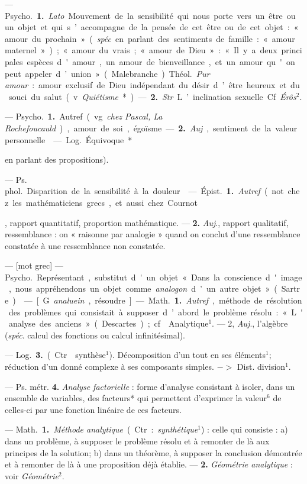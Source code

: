\begin{itemize}[leftmargin=1cm, label=, itemsep=1pt]
{{{ — \si{Psycho.} {\bf 1.} {\it Lato}.
Mouvement de la sensibilité qui nous porte
vers un être ou un objet et qui s’accompagne de la pensée de cet être
ou de cet objet : « amour du prochain » ({\it spéc}. en parlant des
sentiments de famille : « amour maternel »); « amour du vrais; « amour de
Dieu » : « Il y a deux principales
espèces d'amour, un amour de bienveillance, et un amour qu'on peut
appeler d’union » (Malebranche).
\si{Théol.} {\it Pur amour} : amour exclusif
de Dieu indépendant du désir d’être
heureux et du souci du salut (v.
{\it Quiétisme}*). — {\bf 2.} {\it Str}. L’inclination
sexuelle. Cf. {\it Érôs}$^2$.

 — \si{Psycho.} {\bf 1.} Autref.
(vg. {\it chez Pascal, La Rochefoucauld}),
amour de soi, égoïsme. — {\bf 2.} {\it Auj}.,
sentiment de la valeur personnelle.

 — \si{Log.} Équivoque*
{en parlant des propositions).

 — \si{Ps. phol.} Disparition
de la sensibilité à la douleur.

 — \si{Épist.} {\bf 1.} {\it Autref}. (not.
chez les mathématiciens grecs, et
aussi chez Cournot}, rapport quantitatif, proportion mathématique. —
 {\bf 2.} {\it Auj}., rapport qualitatif, ressemblance : on « raisonne par analogie »
quand on conclut d’une ressemblance constatée à une ressemblance
non constatée.

 — [mot grec] — \si{Psycho.} Représentant,
substitut d'un objet
« Dans la conscience d'image, nous
appréhendons un objet comme {\it analogon} d’un autre objet » (Sartre).

 — [G. {\it analuein}, résoudre] —
\si{Math.} {\bf 1.} {\it Autref}., méthode de résolution des problèmes qui consistait
à supposer d’abord le problème résolu : « L'analyse des anciens »
(Descartes) ; cf. {\it }Analytique$^1$. — 2,
{\it Auj}., l'algèbre ({\it spéc}. calcul des fonctions ou calcul infinitésimal).

— \si{Log.} {\bf 3.} (Ctr. {\it }synthèse$^1$).
Décomposition d’un tout en ses éléments$^1$; réduction d'un donné
complexe à ses composants simples. $->$ Dist. division$^1$.

— Ps. métr. {\bf 4.} {\it Analyse factorielle} : forme d'analyse consistant à
isoler, dans un ensemble de variables,
des facteurs* qui permettent d’exprimer la valeur$^6$ de celles-ci par une
fonction linéaire de ces facteurs.

 — \si{Math.} {\bf 1.} {\it Méthode analytique} (Ctr. : {\it synthétique}$^1$) : celle
qui consiste : a) dans un problème,
à supposer le problème résolu et à
remonter de là aux principes de la
solution; b) dans un théorème, à
supposer la conclusion démontrée et
à remonter de là à une proposition
déjà établie. — {\bf 2.} {\it Géométrie analytique} : voir {\it Géométrie}$^2$.

}}}
\end{itemize}
